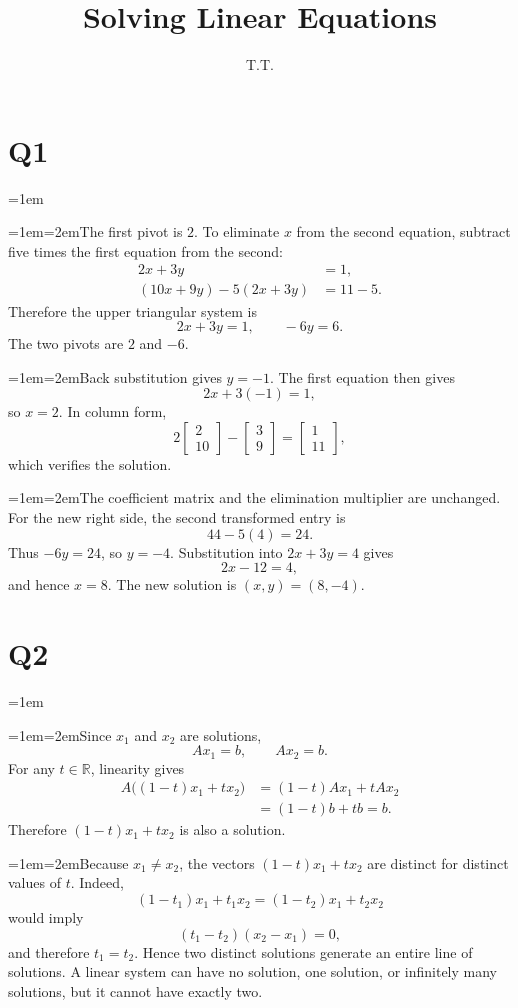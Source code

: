 \documentclass[11pt]{article}
\title{Solving Linear Equations}\author{T.T.}\date{}
\newcommand{\solutionquestion}[1]{\par\leftskip=0pt\section*{Q#1}\leftskip=1em}
\newcommand{\solutionpart}[1]{\par\smallskip\leftskip=1em\noindent\hangindent=2em\hangafter=1\makebox[1.5em][l]{\textbf{(#1)}}\hspace{0.5em}\ignorespaces}
\begin{document}
\maketitle

\solutionquestion{1}
\solutionpart{i}The first pivot is $2$. To eliminate $x$ from the second equation, subtract five times the first equation from the second:
\[
\begin{aligned}
2x+3y&=1,\\
(10x+9y)-5(2x+3y)&=11-5.
\end{aligned}
\]
Therefore the upper triangular system is
\[
2x+3y=1,\qquad -6y=6.
\]
The two pivots are $2$ and $-6$.

\solutionpart{ii}Back substitution gives $y=-1$. The first equation then gives
\[
2x+3(-1)=1,
\]
so $x=2$. In column form,
\[
2\begin{bmatrix}2\\10\end{bmatrix}
-\begin{bmatrix}3\\9\end{bmatrix}
=\begin{bmatrix}1\\11\end{bmatrix},
\]
which verifies the solution.

\solutionpart{iii}The coefficient matrix and the elimination multiplier are unchanged. For the new right side, the second transformed entry is
\[
44-5(4)=24.
\]
Thus $-6y=24$, so $y=-4$. Substitution into $2x+3y=4$ gives
\[
2x-12=4,
\]
and hence $x=8$. The new solution is $(x,y)=(8,-4)$.

\solutionquestion{2}
\solutionpart{i}Since $x_1$ and $x_2$ are solutions,
\[
Ax_1=b,\qquad Ax_2=b.
\]
For any $t\in\mathbb R$, linearity gives
\[
\begin{aligned}
A\bigl((1-t)x_1+tx_2\bigr)
&=(1-t)Ax_1+tAx_2\\
&=(1-t)b+tb=b.
\end{aligned}
\]
Therefore $(1-t)x_1+tx_2$ is also a solution.

\solutionpart{ii}Because $x_1\ne x_2$, the vectors $(1-t)x_1+tx_2$ are distinct for distinct values of $t$. Indeed,
\[
(1-t_1)x_1+t_1x_2=(1-t_2)x_1+t_2x_2
\]
would imply
\[
(t_1-t_2)(x_2-x_1)=0,
\]
and therefore $t_1=t_2$. Hence two distinct solutions generate an entire line of solutions. A linear system can have no solution, one solution, or infinitely many solutions, but it cannot have exactly two.
\end{document}
